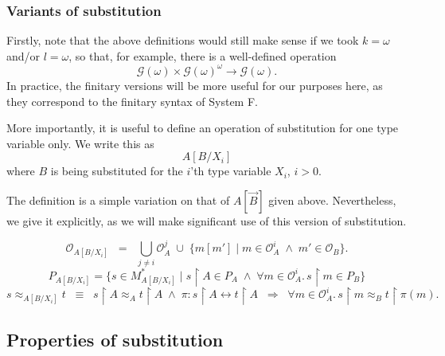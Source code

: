 \documentclass[a4paper,11pt]{article}
\newcommand{\gequiv}{\approx}
\newcommand{\GG}[1]{\mathcal{G}(#1)}
\newcommand{\restrict}{{\upharpoonright}}
\newcommand{\Occ}{\mathcal{O}}
\begin{document}
\subsubsection{Variants of substitution}
Firstly, note that the above definitions would still make sense if we
took $k = \omega$ and/or $l = \omega$, so that, for example, there is a
well-defined operation
\[ \GG{\omega} \times \GG{\omega}^{\omega} \longrightarrow \GG{\omega}
. \]
In practice, the finitary versions will be more useful for our purposes
here, as they correspond to the finitary syntax of System F.

More importantly, it is useful to define an operation of substitution
for one type variable only. We write this as
\[ A[B/X_i ] \]
where $B$ is being substituted for the $i$'th type variable $X_i$, $i
> 0$.

The definition is a simple variation on that of $A[\vec{B}]$ given
  above. Nevertheless, we give it explicitly, as we will make
  significant use of this version of substitution.


\[ \Occ_{A[B/X_{i}]} \;\; = \;\; \bigcup_{j \neq i} \Occ^j_{A} \; \cup \;  \{ m[m'] \mid m \in \Occ_A^i \; \wedge \; m' \in
\Occ_B \}.\]
\[
P_{A[B/X_{i}]} = \{ s \in M_{A[B/X_{i}]}^{\ast} \mid s \restrict A
  \in P_A
\; \wedge \;
\forall m \in \Occ_A^i . \, s \restrict
m \in P_{B} \}
\]
\[
s \gequiv_{A[B/X_{i}]} t \;\; \equiv
\;\; s \restrict A \gequiv_A t
\restrict A
\; \wedge \; \pi : s \restrict A \longleftrightarrow t \restrict A \;\;
\Longrightarrow \;\;
\forall m \in \Occ_A^i . \, s
\restrict m \gequiv_{B} t \restrict \pi (m) .
\]

\subsection{Properties of substitution}
\end{document}
